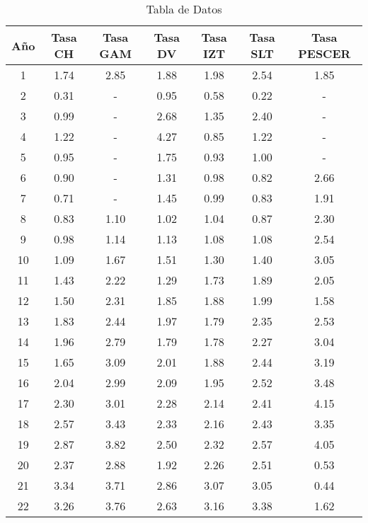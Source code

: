 \documentclass{article}
\begin{document}
\begin{table}
\centering
\begin{tabular}{|c|c|c|c|c|c|c|}
\hline
Año & Tasa CH & Tasa GAM & Tasa DV & Tasa IZT & Tasa SLT & Tasa PESCER \\
\hline
1 & 1.74 & 2.85 & 1.88 & 1.98 & 2.54 & 1.85 \\
2 & 0.31 & - & 0.95 & 0.58 & 0.22 & - \\
3 & 0.99 & - & 2.68 & 1.35 & 2.40 & - \\
4 & 1.22 & - & 4.27 & 0.85 & 1.22 & - \\
5 & 0.95 & - & 1.75 & 0.93 & 1.00 & - \\
6 & 0.90 & - & 1.31 & 0.98 & 0.82 & 2.66 \\
7 & 0.71 & - & 1.45 & 0.99 & 0.83 & 1.91 \\
8 & 0.83 & 1.10 & 1.02 & 1.04 & 0.87 & 2.30 \\
9 & 0.98 & 1.14 & 1.13 & 1.08 & 1.08 & 2.54 \\
10 & 1.09 & 1.67 & 1.51 & 1.30 & 1.40 & 3.05 \\
11 & 1.43 & 2.22 & 1.29 & 1.73 & 1.89 & 2.05 \\
12 & 1.50 & 2.31 & 1.85 & 1.88 & 1.99 & 1.58 \\
13 & 1.83 & 2.44 & 1.97 & 1.79 & 2.35 & 2.53 \\
14 & 1.96 & 2.79 & 1.79 & 1.78 & 2.27 & 3.04 \\
15 & 1.65 & 3.09 & 2.01 & 1.88 & 2.44 & 3.19 \\
16 & 2.04 & 2.99 & 2.09 & 1.95 & 2.52 & 3.48 \\
17 & 2.30 & 3.01 & 2.28 & 2.14 & 2.41 & 4.15 \\
18 & 2.57 & 3.43 & 2.33 & 2.16 & 2.43 & 3.35 \\
19 & 2.87 & 3.82 & 2.50 & 2.32 & 2.57 & 4.05 \\
20 & 2.37 & 2.88 & 1.92 & 2.26 & 2.51 & 0.53 \\
21 & 3.34 & 3.71 & 2.86 & 3.07 & 3.05 & 0.44 \\
22 & 3.26 & 3.76 & 2.63 & 3.16 & 3.38 & 1.62 \\
\hline
\end{tabular}
\caption{Tabla de Datos}
\label{tab:datos4}
\end{table}
\end{document}
